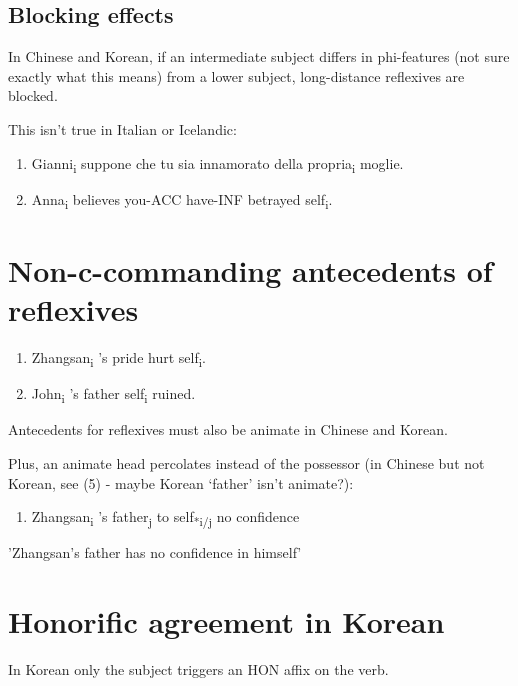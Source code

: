 \subsection*{Blocking effects}

In Chinese and Korean, if an intermediate subject differs in phi-features (not sure exactly what this means) from a lower subject, long-distance reflexives are blocked.

This isn't true in Italian or Icelandic:

\begin{enumerate}[start=2]
  \item Gianni\textsubscript{i} suppone che tu sia innamorato della propria\textsubscript{i} moglie.
  \item Anna\textsubscript{i} believes you-ACC have-INF betrayed self\textsubscript{i}.
\end{enumerate}

\section*{Non-c-commanding antecedents of reflexives}

\begin{enumerate}[start=4]
  \item Zhangsan\textsubscript{i} 's pride hurt self\textsubscript{i}.
  \item John\textsubscript{i} 's father self\textsubscript{i} ruined.
\end{enumerate}

Antecedents for reflexives must also be animate in Chinese and Korean.

Plus, an animate head percolates instead of the possessor (in Chinese but not Korean, see (5) - maybe Korean `father' isn't animate?):

\begin{enumerate}[start=6]
  \item Zhangsan\textsubscript{i} 's father\textsubscript{j} to self\textsubscript{*i/j} no confidence
\end{enumerate}

'Zhangsan's father has no confidence in himself'

\section*{Honorific agreement in Korean}

In Korean only the subject triggers an HON affix on the verb.


